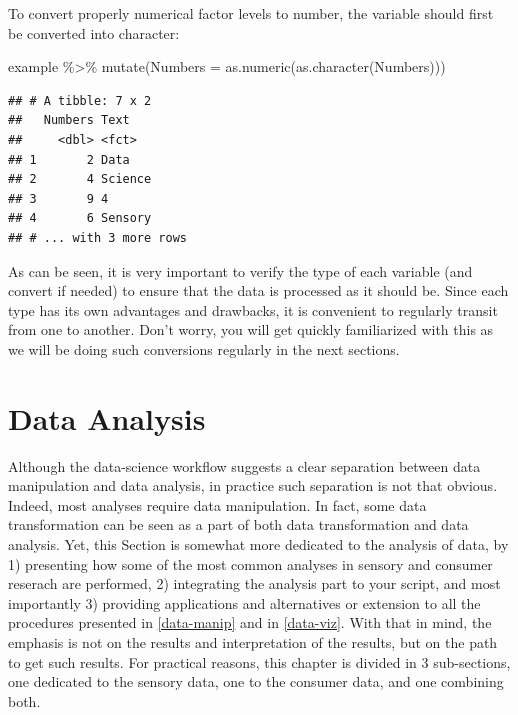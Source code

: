 \documentclass[
]{krantz}
\makeatletter
\newenvironment{Shaded}{\begin{snugshade}}{\end{snugshade}}
\newcommand{\AttributeTok}[1]{\textcolor[rgb]{0.61,0.61,0.61}{#1}}
\newcommand{\FunctionTok}[1]{\textcolor[rgb]{0,0,0}{#1}}
\newcommand{\NormalTok}[1]{#1}
\newcommand{\SpecialCharTok}[1]{\textcolor[rgb]{0,0,0}{#1}}
\renewenvironment{quote}{\begin{VF}}{\end{VF}}
\newenvironment{kframe}{%
\medskip{}
\setlength{\fboxsep}{.8em}
 \def\at@end@of@kframe{}%
 \ifinner\ifhmode%
  \def\at@end@of@kframe{\end{minipage}}%
  \begin{minipage}{\columnwidth}%
 \fi\fi%
 \def\FrameCommand##1{\hskip\@totalleftmargin \hskip-\fboxsep
 \colorbox{shadecolor}{##1}\hskip-\fboxsep
     \hskip-\linewidth \hskip-\@totalleftmargin \hskip\columnwidth}%
 \MakeFramed {\advance\hsize-\width
   \@totalleftmargin\z@ \linewidth\hsize
   \@setminipage}}%
 {\par\unskip\endMakeFramed%
 \at@end@of@kframe}
\renewenvironment{Shaded}{\begin{kframe}}{\end{kframe}}
\makeatother
\begin{document}
To convert properly numerical factor levels to number, the variable should first be converted into character:

\begin{Shaded}
\begin{Highlighting}[]
\NormalTok{example }\SpecialCharTok{\%\textgreater{}\%}
  \FunctionTok{mutate}\NormalTok{(}\AttributeTok{Numbers =} \FunctionTok{as.numeric}\NormalTok{(}\FunctionTok{as.character}\NormalTok{(Numbers)))}
\end{Highlighting}
\end{Shaded}

\begin{verbatim}
## # A tibble: 7 x 2
##   Numbers Text   
##     <dbl> <fct>  
## 1       2 Data   
## 2       4 Science
## 3       9 4      
## 4       6 Sensory
## # ... with 3 more rows
\end{verbatim}

As can be seen, it is very important to verify the type of each variable (and convert if needed) to ensure that the data is processed as it should be. Since each type has its own advantages and drawbacks, it is convenient to regularly transit from one to another. Don't worry, you will get quickly familiarized with this as we will be doing such conversions regularly in the next sections.

\hypertarget{data-analysis}{%
\chapter{Data Analysis}\label{data-analysis}}

\begin{quote}
Although the data-science workflow suggests a clear separation between data manipulation and data analysis, in practice such separation is not that obvious. Indeed, most analyses require data manipulation. In fact, some data transformation can be seen as a part of both data transformation and data analysis. Yet, this Section is somewhat more dedicated to the analysis of data, by 1) presenting how some of the most common analyses in sensory and consumer reserach are performed, 2) integrating the analysis part to your script, and most importantly 3) providing applications and alternatives or extension to all the procedures presented in \ref{data-manip} and in \ref{data-viz}. With that in mind, the emphasis is not on the results and interpretation of the results, but on the path to get such results.
For practical reasons, this chapter is divided in 3 sub-sections, one dedicated to the sensory data, one to the consumer data, and one combining both.
\end{quote}
\end{document}
